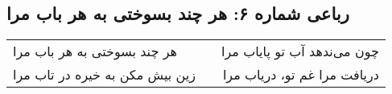 \begin{center}
\section*{رباعی شماره ۶: هر چند بسوختی به هر باب مرا}
\label{sec:sh006}
\begin{longtable}{l p{0.5cm} r}
هر چند بسوختی به هر باب مرا
&&
چون می‌ندهد آب تو پایاب مرا
\\
زین بیش مکن به خیره در تاب مرا
&&
دریافت مرا غم تو، دریاب مرا
\\
\end{longtable}
\end{center}
